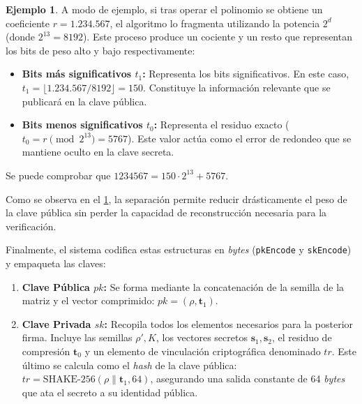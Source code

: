 \documentclass[11pt, a4paper]{report}
\theoremstyle{definition}
\newtheorem{ejemplo}{Ejemplo}[chapter]
\begin{document}
\begin{ejemplo}
\label{ex:power2round}
A modo de ejemplo, si tras operar el polinomio se obtiene un coeficiente $r = 1.234.567$, el algoritmo lo fragmenta utilizando la potencia $2^d$ (donde $2^{13} = 8192$). Este proceso produce un cociente y un resto que representan los bits de peso alto y bajo respectivamente:
\begin{itemize}
    \item \textbf{Bits más significativos $t_1$:} Representa los bits significativos. En este caso, $t_1 = \lfloor 1.234.567 / 8192 \rfloor = 150$. Constituye la información relevante que se publicará en la clave pública.
    \item \textbf{Bits menos significativos $t_0$:} Representa el residuo exacto ($t_0 = r \pmod{2^{13}} = 5767$). Este valor actúa como el error de redondeo que se mantiene oculto en la clave secreta.
\end{itemize}
Se puede comprobar que $1234567 = 150 \cdot 2^{13} + 5767$.
\end{ejemplo}

Como se observa en el \ref{ex:power2round}, la separación permite reducir drásticamente el peso de la clave pública sin perder la capacidad de reconstrucción necesaria para la verificación.

Finalmente, el sistema codifica estas estructuras en \textit{bytes} (\texttt{pkEncode} y \texttt{skEncode}) y empaqueta las claves:
\begin{enumerate}
    \item \textbf{Clave Pública $pk$:} Se forma mediante la concatenación de la semilla de la matriz y el vector comprimido: $pk = (\rho, \mathbf{t}_1)$.
    \item \textbf{Clave Privada $sk$:} Recopila todos los elementos necesarios para la posterior firma. Incluye las semillas $\rho', K$, los vectores secretos $\mathbf{s}_1, \mathbf{s}_2$, el residuo de compresión $\mathbf{t}_0$ y un elemento de vinculación criptográfica denominado $tr$. Este último se calcula como el \textit{hash} de la clave pública: $tr = \text{SHAKE-256}(\rho \parallel \mathbf{t}_1, 64)$, asegurando una salida constante de 64 \textit{bytes} que ata el secreto a su identidad pública.
\end{enumerate}
\end{document}
